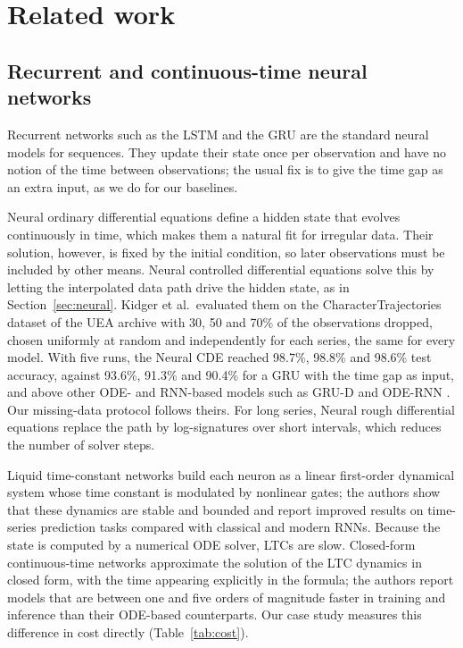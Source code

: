 \section{Related work}\label{sec:related}

\subsection{Recurrent and continuous-time neural networks}

Recurrent networks such as the LSTM \cite{hochreiter1997lstm} and the GRU
\cite{cho2014gru} are the standard neural models for sequences. They
update their state once per observation and have no notion of the time
between observations; the usual fix is to give the time gap as an extra
input, as we do for our baselines.

Neural ordinary differential equations \cite{chen2018neuralode} define a
hidden state that evolves continuously in time, which makes them a natural
fit for irregular data. Their solution, however, is fixed by the initial
condition, so later observations must be included by other means.
Neural controlled differential equations \cite{kidger2020ncde} solve this
by letting the interpolated data path drive the hidden state, as in
Section~\ref{sec:neural}. Kidger et al.\ evaluated them on the
CharacterTrajectories dataset of the UEA archive with 30, 50 and 70\% of
the observations dropped, chosen uniformly at random and independently
for each series, the same for every model. With five runs, the Neural CDE
reached 98.7\%, 98.8\% and 98.6\% test accuracy, against 93.6\%, 91.3\%
and 90.4\% for a GRU with the time gap as input, and above other ODE- and
RNN-based models such as GRU-D and ODE-RNN \cite{kidger2020ncde}. Our
missing-data protocol follows theirs. For long series, Neural rough
differential equations \cite{morrill2021nrde} replace the path by
log-signatures over short intervals, which reduces the number of solver
steps.

Liquid time-constant networks \cite{hasani2021ltc} build each neuron as a
linear first-order dynamical system whose time constant is modulated by
nonlinear gates; the authors show that these dynamics are stable and
bounded and report improved results on time-series prediction tasks
compared with classical and modern RNNs. Because the state is computed by
a numerical ODE solver, LTCs are slow. Closed-form continuous-time networks
\cite{hasani2022cfc} approximate the solution of the LTC dynamics in
closed form, with the time appearing explicitly in the formula; the
authors report models that are between one and five orders of magnitude
faster in training and inference than their ODE-based counterparts. Our
case study measures this difference in cost directly
(Table~\ref{tab:cost}).

